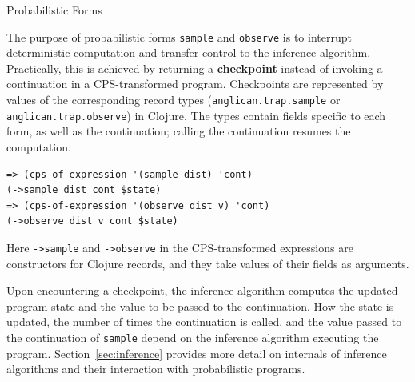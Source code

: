 \documentclass[preprint]{sigplanconf}
\begin{document}
\iftoggle{full}{%

}{%
}%

\iftoggle{full}{%
\subsection{Implementation Highlights}
\label{seq:highlights}

So far we introduced the basics of Anglican compilation to
Clojure. The described approaches and techniques are important
for grasping the language implementation but relatively well-known.
In the rest of the section we focus on challenges we met and
resolved while implementing Anglican, as well as on
implementation of unique features of Anglican as a probabilistic
programming language.
}{%
}%

\iftoggle{full}{\subsubsection}{\subsection}{Probabilistic Forms}
\label{seq:forms}

The purpose of probabilistic forms \texttt{sample} and
\texttt{observe} is to interrupt deterministic computation and
transfer control to the inference algorithm.  Practically, this
is achieved by  returning a \textbf{checkpoint} instead of
invoking a continuation in a CPS-transformed program.  
Checkpoints are represented by values of the
corresponding record types
(\texttt{anglican.{\linebreak[0]}trap.{\linebreak[0]}sample} or
\texttt{anglican.{\linebreak[0]}trap.{\linebreak[0]}observe})
in Clojure. The types contain fields specific to each form, as well as the
continuation; calling the continuation resumes the computation.
\begin{lstlisting}[style=default]
=> (cps-of-expression '(sample dist) 'cont)
(->sample dist cont $state)
=> (cps-of-expression '(observe dist v) 'cont)
(->observe dist v cont $state)
\end{lstlisting}
Here \texttt{->sample} and \texttt{->observe} in the
CPS-transformed expressions are constructors for Clojure
records, and they take values of their fields as arguments.

Upon encountering a checkpoint, the inference algorithm computes
the updated program state and the value to be passed to the
continuation.  How the state is updated, the number of times the
continuation is called, and the value passed to the continuation
of \texttt{sample} depend on the inference algorithm executing
the program.  Section~\ref{sec:inference} provides more detail
on internals of inference algorithms and their interaction with
probabilistic programs.
\end{document}
